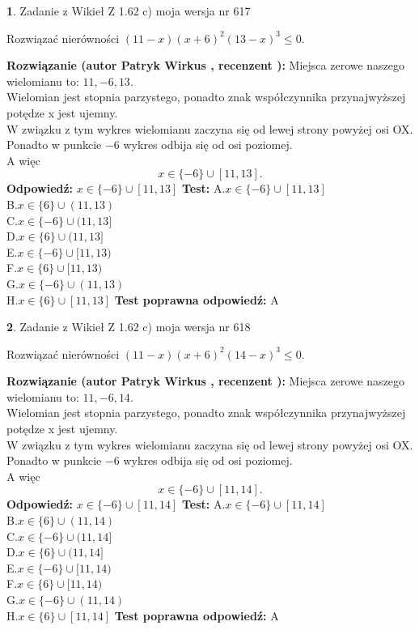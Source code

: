 \documentclass[12pt, a4paper]{article}
\theoremstyle{definition} %
\newtheorem{zad}{}
\newcommand{\zadStart}[1]{\begin{zad}#1\newline}
\newcommand{\zadStop}{\end{zad}}
\newcommand{\rozwStart}[2]{\noindent \textbf{Rozwiązanie (autor #1 , recenzent #2): }\newline}
\newcommand{\rozwStop}{\newline}
\newcommand{\odpStart}{\noindent \textbf{Odpowiedź:}\newline}
\newcommand{\odpStop}{\newline}
\newcommand{\testStart}{\noindent \textbf{Test:}\newline}
\newcommand{\testStop}{\newline}
\newcommand{\kluczStart}{\noindent \textbf{Test poprawna odpowiedź:}\newline}
\newcommand{\kluczStop}{\newline}
\begin{document}
\zadStart{Zadanie z Wikieł Z 1.62 c) moja wersja nr 617}

Rozwiązać nierówności $(11-x)(x+6)^{2}(13-x)^{3}\le0$.
\zadStop
\rozwStart{Patryk Wirkus}{}
Miejsca zerowe naszego wielomianu to: $11, -6, 13$.\\
Wielomian jest stopnia parzystego, ponadto znak współczynnika przy\linebreak najwyższej potędze x jest ujemny.\\ W związku z tym wykres wielomianu zaczyna się od lewej strony powyżej osi OX.\\
Ponadto w punkcie $-6$ wykres odbija się od osi poziomej.\\
A więc $$x \in \{-6\} \cup [11,13].$$
\rozwStop
\odpStart
$x \in \{-6\} \cup [11,13]$
\odpStop
\testStart
A.$x \in \{-6\} \cup [11,13]$\\
B.$x \in \{6\} \cup (11,13)$\\
C.$x \in \{-6\} \cup (11,13]$\\
D.$x \in \{6\} \cup (11,13]$\\
E.$x \in \{-6\} \cup [11,13)$\\
F.$x \in \{6\} \cup [11,13)$\\
G.$x \in \{-6\} \cup (11,13)$\\
H.$x \in \{6\} \cup [11,13]$
\testStop
\kluczStart
A
\kluczStop



\zadStart{Zadanie z Wikieł Z 1.62 c) moja wersja nr 618}

Rozwiązać nierówności $(11-x)(x+6)^{2}(14-x)^{3}\le0$.
\zadStop
\rozwStart{Patryk Wirkus}{}
Miejsca zerowe naszego wielomianu to: $11, -6, 14$.\\
Wielomian jest stopnia parzystego, ponadto znak współczynnika przy\linebreak najwyższej potędze x jest ujemny.\\ W związku z tym wykres wielomianu zaczyna się od lewej strony powyżej osi OX.\\
Ponadto w punkcie $-6$ wykres odbija się od osi poziomej.\\
A więc $$x \in \{-6\} \cup [11,14].$$
\rozwStop
\odpStart
$x \in \{-6\} \cup [11,14]$
\odpStop
\testStart
A.$x \in \{-6\} \cup [11,14]$\\
B.$x \in \{6\} \cup (11,14)$\\
C.$x \in \{-6\} \cup (11,14]$\\
D.$x \in \{6\} \cup (11,14]$\\
E.$x \in \{-6\} \cup [11,14)$\\
F.$x \in \{6\} \cup [11,14)$\\
G.$x \in \{-6\} \cup (11,14)$\\
H.$x \in \{6\} \cup [11,14]$
\testStop
\kluczStart
A
\kluczStop
\end{document}
